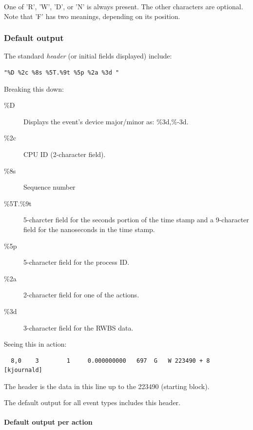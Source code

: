 \documentclass{article}
\begin{document}
One of 'R', 'W', 'D', or 'N' is always present. The other characters are
optional. Note that 'F' has two meanings, depending on its position.

\subsubsection{\label{sec:default-output}Default output}

The standard \emph{header} (or initial fields displayed) include:

\begin{verbatim}
"%D %2c %8s %5T.%9t %5p %2a %3d "
\end{verbatim}

Breaking this down:

\begin{description}
  \item[\%D] Displays the event's device major/minor as: \%3d,\%-3d.
  \item[\%2c] CPU ID (2-character field).
  \item[\%8s] Sequence number
  \item[\%5T.\%9t] 5-charcter field for the seconds portion of the
  time stamp and a 9-character field for the nanoseconds in the time stamp.
  \item[\%5p] 5-character field for the process ID.
  \item[\%2a] 2-character field for one of the actions.
  \item[\%3d] 3-character field for the RWBS data.
\end{description}

Seeing this in action:

\begin{verbatim}
  8,0    3        1     0.000000000   697  G   W 223490 + 8 [kjournald]
\end{verbatim}

The header is the data in this line up to the 223490 (starting block). 

The default output for all event types includes this header.

\paragraph{Default output per action}
\end{document}
